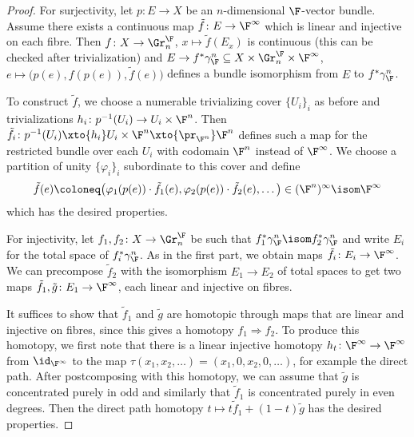 \begin{proof}
	For surjectivity, let $p\colon E \to X$ be an $n$-dimensional $\F$-vector bundle.
	Assume there exists a continuous map $\tilde{f}\colon E \to \F^\infty$ which is linear and injective on each fibre.
	Then $f\colon X \to \Gr_n^{\F}$, $x \mapsto \tilde{f}(E_x)$ is continuous (this can be checked after trivialization) and $E \to f^* \gamma_{\F}^n \subseteq X \times \Gr_n^{\F} \times \F^\infty$, $e \mapsto \big(p(e), f(p(e)), \tilde{f}(e)\big)$ defines a bundle isomorphism from $E$ to $f^* \gamma_{\F}^n$.

	To construct $\tilde{f}$, we choose a numerable trivializing cover $\{U_i\}_i$ as before and trivializations $h_i\colon p^{-1}(U_i) \to U_i \times \F^n$.
	Then $\tilde{f}_i\colon p^{-1}(U_i) \xto{h_i} U_i \times \F^n \xto{\pr_{\F^n}} \F^n$ defines such a map for the restricted bundle over each $U_i$ with codomain $\F^n$ instead of $\F^\infty$.
	We choose a partition of unity $\{\varphi_i\}_i$ subordinate to this cover and define
	\begin{equation*}
		\tilde{f}(e) \coloneq \big(\varphi_1(p(e)) \cdot \tilde{f}_1(e), \varphi_2(p(e)) \cdot \tilde{f}_2(e), \ldots\big) \in (\F^n)^\infty \isom \F^\infty
	\end{equation*}
	which has the desired properties.

	For injectivity, let $f_1, f_2\colon X \to \Gr^{\F}_n$ be such that $f_1^* \gamma_{\F}^n \isom f_2^* \gamma_{\F}^n$ and write $E_i$ for the total space of $f_i^* \gamma_{\F}^n$.
	As in the first part, we obtain maps $\tilde{f}_i\colon E_i \to \F^\infty$.
	We can precompose $\tilde{f}_2$ with the isomorphism $E_1 \to E_2$ of total spaces to get two maps $\tilde{f}_1, \tilde{g}\colon E_1 \to \F^\infty$, each linear and injective on fibres.

	It suffices to show that $\tilde{f}_1$ and $\tilde{g}$ are homotopic through maps that are linear and injective on fibres, since this gives a homotopy $f_1 \Rightarrow f_2$.
	To produce this homotopy, we first note that there is a linear injective homotopy $h_t\colon \F^\infty \to \F^\infty$ from $\id_{\F^\infty}$ to the map $\tau(x_1, x_2, \ldots) = (x_1, 0, x_2, 0, \ldots)$, for example the direct path.
	After postcomposing with this homotopy, we can assume that $\tilde{g}$ is concentrated purely in odd and similarly that $\tilde{f}_1$ is concentrated purely in even degrees.
	Then the direct path homotopy $t \mapsto t \tilde{f}_1 + (1 - t) \tilde{g}$ has the desired properties.
\end{proof}
